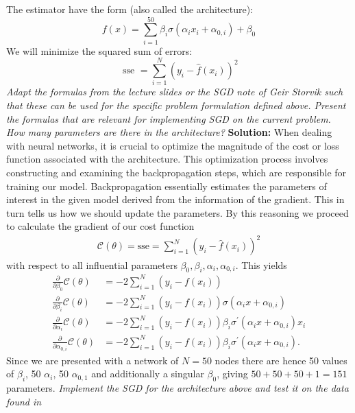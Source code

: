 The estimator have the form (also called the architecture):
$$
f(x)=\sum_{i=1}^{50} \beta_i \sigma\left(\alpha_i x_i +\alpha_{0, i}\right)+\beta_0
$$
We will minimize the squared sum of errors:
$$
\text { sse }=\sum_{i=1}^N\left(y_i-\hat{f}\left(x_i\right)\right)^2
$$
\emph{Adapt the formulas from the lecture slides or the SGD note of Geir Storvik such that
these can be used for the specific problem formulation defined above. Present the
formulas that are relevant for implementing SGD on the current problem. How many
parameters are there in the architecture?} \spaze
\textbf{Solution:} \spaze
When dealing with neural networks, it is crucial to optimize the magnitude of the cost or loss function associated with the architecture. This optimization process involves constructing and examining the backpropagation steps, which are responsible for training our model. Backpropagation essentially estimates the parameters of interest in the given model derived from the information of the gradient. This in turn tells us how we should update the parameters. \spaze
By this reasoning we proceed to calculate the gradient of our cost function 
\begin{align*}
    \mathcal{C}(\theta) = \text{sse} = \sum_{i=1}^N\left(y_i-\hat{f}\left(x_i\right)\right)^2
\end{align*}
with respect to all influential parameters $\beta_0, \beta_i, \alpha_i, \alpha_{0,i}$. This yields 
\begin{align}
    \frac{\partial}{\partial \beta_0} \mathcal{C}(\theta) &= -2 \sum_{i=1}^N (y_i - f(x_i)) \\[7pt]
     \frac{\partial}{\partial \beta_i} \mathcal{C}(\theta) &= -2 \sum_{i=1}^N \left( y_i -  f(x_i) \right) \sigma\left(\alpha_i x+\alpha_{0, i}\right) \\[7pt]
    \frac{\partial}{\partial \alpha_i} \mathcal{C}(\theta) &= -2 \sum_{i=1}^N \left( y_i -  f(x_i) \right)\beta_i \sigma^{\prime} \left(\alpha_i x+\alpha_{0, i}\right)x_i \\[7pt]
    \frac{\partial}{\partial \alpha_{0,i}} \mathcal{C}(\theta) &= -2 \sum_{i=1}^N \left( y_i -  f(x_i) \right)\beta_i \sigma^{\prime} \left(\alpha_i x+\alpha_{0, i}\right).
\end{align}
Since we are presented with a network of $N = 50$ nodes there are hence 50 values of $\beta_i$, 50 $\alpha_i$, 50 $\alpha_{0,1}$ and additionally a singular $\beta_0$, giving $50 + 50 + 50 + 1 = 151$ parameters. 
\emph{Implement the SGD for the architecture above and test it on the data found in}
